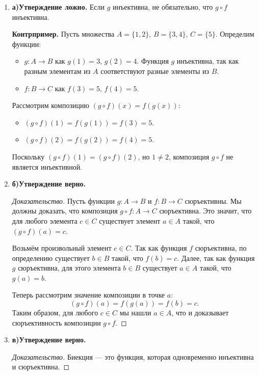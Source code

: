 \documentclass[12pt]{article}
\begin{document}
\begin{enumerate}[label=(\asbuk*)]
    \item \textbf{а)Утверждение ложно.} Если $g$ инъективна, не обязательно, что $g \circ f$ инъективна.
    
    \textbf{Контрпример.}
    Пусть множества $A = \{1, 2\}$, $B = \{3, 4\}$, $C = \{5\}$.
    Определим функции:
    \begin{itemize}
        \item $g \colon A \to B$ как $g(1) = 3$, $g(2) = 4$. Функция $g$ инъективна, так как разным элементам из $A$ соответствуют разные элементы из $B$.
        \item $f \colon B \to C$ как $f(3) = 5$, $f(4) = 5$.
    \end{itemize}
    Рассмотрим композицию $(g \circ f)(x) = f(g(x))$:
    \begin{itemize}
        \item $(g \circ f)(1) = f(g(1)) = f(3) = 5$.
        \item $(g \circ f)(2) = f(g(2)) = f(4) = 5$.
    \end{itemize}
    Поскольку $(g \circ f)(1) = (g \circ f)(2)$, но $1 \neq 2$, композиция $g \circ f$ не является инъективной.

    \item \textbf{б)Утверждение верно.}
    
    \begin{proof}[Доказательство]
    Пусть функции $g \colon A \to B$ и $f \colon B \to C$ сюръективны. Мы должны доказать, что композиция $g \circ f \colon A \to C$ сюръективна.
    Это значит, что для любого элемента $c \in C$ существует элемент $a \in A$ такой, что $(g \circ f)(a) = c$.
    
    Возьмём произвольный элемент $c \in C$.
    Так как функция $f$ сюръективна, по определению существует $b \in B$ такой, что $f(b) = c$.
    Далее, так как функция $g$ сюръективна, для этого элемента $b \in B$ существует $a \in A$ такой, что $g(a) = b$.
    
    Теперь рассмотрим значение композиции в точке $a$:
    \[ (g \circ f)(a) = f(g(a)) = f(b) = c. \]
    Таким образом, для любого $c \in C$ мы нашли $a \in A$, что и доказывает сюръективность композиции $g \circ f$.
    \end{proof}

    \item \textbf{в)Утверждение верно.}
    
    \begin{proof}[Доказательство]
    Биекция — это функция, которая одновременно инъективна и сюръективна.
    

\end{proof}
\end{enumerate}
\end{document}
